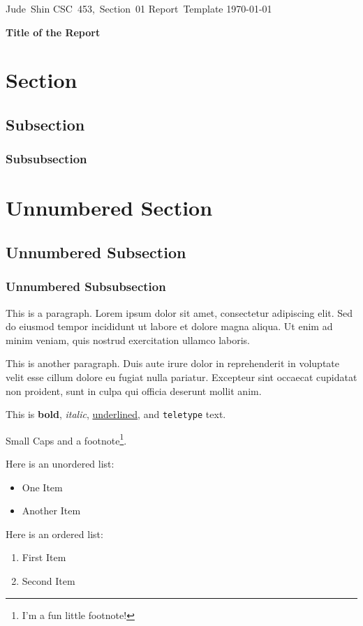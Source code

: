 \documentclass[11pt]{article}
\begin{document}
\hfill\vbox{\hbox{Jude Shin}
		\hbox{CSC 453, Section 01}	
		\hbox{Report Template}	
		\hbox{\today}}\par

\bigskip
\centerline{\Large\bf Title of the Report}\par
\bigskip

\section{Section}
\subsection{Subsection}
\subsubsection{Subsubsection}

\section*{Unnumbered Section}
\subsection*{Unnumbered Subsection}
\subsubsection*{Unnumbered Subsubsection}

This is a paragraph. Lorem ipsum dolor sit amet, consectetur adipiscing elit.
Sed do eiusmod tempor incididunt ut labore et dolore magna aliqua.
Ut enim ad minim veniam, quis nostrud exercitation ullamco laboris.

This is another paragraph. Duis aute irure dolor in reprehenderit in voluptate
velit esse cillum dolore eu fugiat nulla pariatur. Excepteur sint occaecat
cupidatat non proident, sunt in culpa qui officia deserunt mollit anim.

This is \textbf{bold}, \textit{italic}, \underline{underlined}, and {\tt teletype} text.

{\sc Small Caps} and a footnote\footnote{I'm a fun little footnote!}.

Here is an unordered list:
\begin{itemize}
	\item One Item
	\item Another Item
\end{itemize}

Here is an ordered list:
\begin{enumerate}
	\item First Item
	\item Second Item
\end{enumerate}
\end{document}
